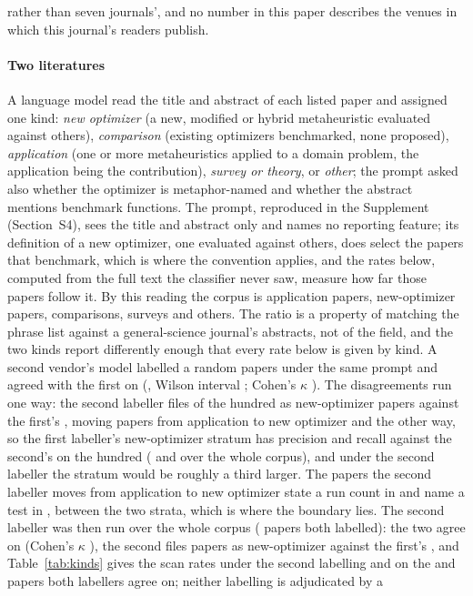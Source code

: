 \documentclass[preprint,review,12pt]{elsarticle}
\begin{document}
rather than seven journals', and no number in this paper describes the venues in which this journal's readers publish.

\paragraph{Two literatures} A language model read the title and abstract of each listed paper and assigned one kind: \emph{new optimizer} (a new, modified or hybrid metaheuristic evaluated against others), \emph{comparison} (existing optimizers benchmarked, none proposed), \emph{application} (one or more metaheuristics applied to a domain problem, the application being the contribution), \emph{survey or theory}, or \emph{other}; the prompt asked also whether the optimizer is metaphor-named and whether the abstract mentions benchmark functions. The prompt, reproduced in the Supplement (Section~S4), sees the title and abstract only and names no reporting feature; its definition of a new optimizer, one evaluated against others, does select the papers that benchmark, which is where the convention applies, and the rates below, computed from the full text the classifier never saw, measure how far those papers follow it. By this reading the corpus is \nKcApplication{} application papers, \nKcNewOptimizer{} new-optimizer papers, \nKcComparison{} comparisons, \nKcSurveyTheory{} surveys and \nKcOther{} others. The ratio is a property of matching the phrase list against a general-science journal's abstracts, not of the field, and the two kinds report differently enough that every rate below is given by kind. A second vendor's model labelled a random \nKaPapers{} papers under the same prompt and agreed with the first on \nKaAgree{} (\nKaPctAgree{}, Wilson interval \cite{wilson1927probable} \nKaCiAgree{}; Cohen's $\kappa$ \cite{cohen1960coefficient} \nKaKappa{}). The disagreements run one way: the second labeller files \nKaDirSecondNewOptimizer{} of the hundred as new-optimizer papers against the first's \nKaDirFirstNewOptimizer{}, moving \nKaDirApplicationToNewOptimizer{} papers from application to new optimizer and \nKaDirNewOptimizerToApplication{} the other way, so the first labeller's new-optimizer stratum has precision \nKaDirPrecisionVsSecond{} and recall \nKaDirRecallVsSecond{} against the second's on the hundred (\nKafDirPrecisionVsSecond{} and \nKafDirRecallVsSecond{} over the whole corpus), and under the second labeller the stratum would be roughly a third larger. The \nKafStDisputedToNewOptimizerPapers{} papers the second labeller moves from application to new optimizer state a run count in \nKafStDisputedToNewOptimizerRuns{} and name a test in \nKafStDisputedToNewOptimizerTest{}, between the two strata, which is where the boundary lies. The second labeller was then run over the whole corpus (\nKafPapers{} papers both labelled): the two agree on \nKafPctAgree{} (Cohen's $\kappa$ \nKafKappa{}), the second files \nKafDirSecondNewOptimizer{} papers as new-optimizer against the first's \nKafDirFirstNewOptimizer{}, and Table~\ref{tab:kinds} gives the scan rates under the second labelling and on the \nKafStBothNewOptimizerPapers{} and \nKafStBothApplicationPapers{} papers both labellers agree on; neither labelling is adjudicated by a 
\end{document}
